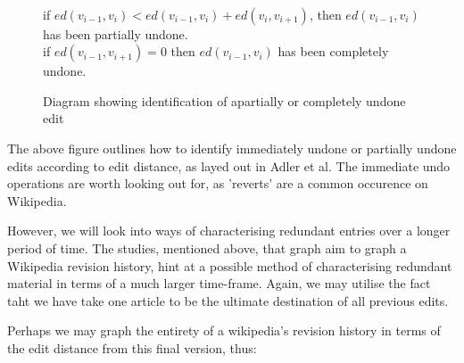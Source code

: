 \documentclass[a4paper,11pt,twoside,notitlepage]{article}
\begin{document}
        \begin{figure}[H]
          \centering
          \\
          if $ed(v_{i-1},v_i) < ed(v_{i-1},v_i) + ed(v_{i},v_{i+1})$,
          then $ed(v_{i-1},v_i)$ has been partially undone.\\ if
          $ed(v_{i-1},v_{i+1}) = 0$ then $ed(v_{i-1},v_i)$ has been
          completely undone.
          \caption{Diagram showing identification of apartially or
            completely undone edit}
          \label{fig:undo}
        \end{figure}

        The above figure outlines how to identify immediately undone
        or partially undone edits according to edit distance, as layed
        out in Adler et al\cite{Adler2007}. The immediate undo
        operations are worth looking out for, as 'reverts' are a
        common occurence on Wikipedia.

        However, we will look into ways of characterising redundant
        entries over a longer period of time. The studies, mentioned
        above, that graph aim to graph a Wikipedia revision history,
        hint at a possible method of characterising redundant material
        in terms of a much larger time-frame. Again, we may utilise
        the fact taht we have take one article to be the ultimate
        destination of all previous edits. 

        Perhaps we may graph the entirety of a wikipedia's revision
        history in terms of the edit distance from this final version,
        thus:

        \begin{figure}[H]
          \centering
          \pgfplotsset{width=0.5\textwidth}
          \label{fig:dummy_history}
        \end{figure}
        
\end{document}
